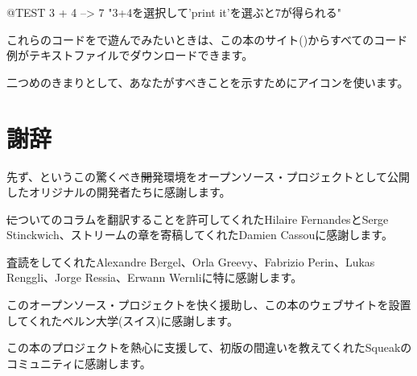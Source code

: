 \documentclass[a4paper,10pt,twoside]{book}
\begin{document}
\begin{code}{@TEST}
3 + 4 --> 7    "3+4を選択して'print it'を選ぶと7が得られる"
\end{code}

これらのコードを\pharo で遊んでみたいときは、この本のサイト(\pbe)からすべてのコード例がテキストファイルでダウンロードできます。

二つめのきまりとして、あなたがすべきことを示すために\dothisicon{}アイコンを使います。


\section*{謝辞}

先ず、\squeak というこの驚くべき\st 開発環境をオープンソース・プロジェクトとして公開したオリジナルの開発者たちに感謝します。

\st についてのコラムを翻訳することを許可してくれたHilaire FernandesとSerge Stinckwich、ストリームの章を寄稿してくれたDamien Cassouに感謝します。

査読をしてくれたAlexandre Bergel、Orla Greevy、Fabrizio Perin、Lukas Renggli、Jorge Ressia、Erwann Wernliに特に感謝します。

このオープンソース・プロジェクトを快く援助し、この本のウェブサイトを設置してくれたベルン大学(スイス)に感謝します。

この本のプロジェクトを熱心に支援して、初版の間違いを教えてくれたSqueakのコミュニティに感謝します。

\ifx\wholebook\relax\else
   
   
\end{document}
